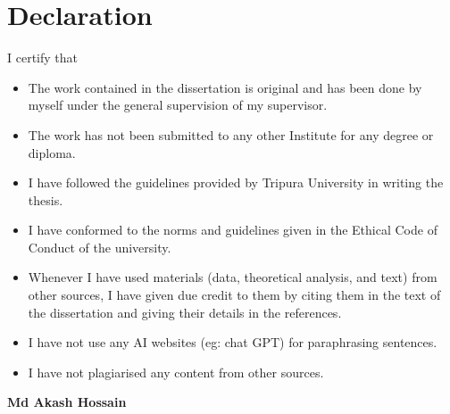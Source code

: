\sloppy
\chapter*{\centering Declaration}

I certify that
\begin{itemize}
	\item The work contained in the dissertation is original and has been done by myself under the general supervision of my supervisor.
	\item The work has not been submitted to any other Institute for any degree or diploma.
	\item I have followed the guidelines provided by Tripura University in writing the thesis.
	\item I have conformed to the norms and guidelines given in the Ethical Code of Conduct of the university.
	\item Whenever I have used materials (data, theoretical analysis, and text) from other sources, I have given due credit to them by citing them in the text of the dissertation and giving their details in the references.	
 \item I have not use any AI websites (eg: chat GPT) for paraphrasing sentences.
 \item I have not plagiarised any content from other sources.
\end{itemize}

\vspace{0.7 in}
\begin{flushright}
{\bf Md Akash Hossain}
\end{flushright}



